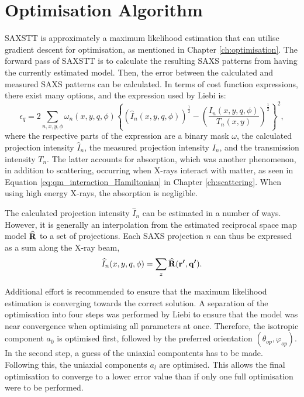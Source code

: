 \section{Optimisation Algorithm}

SAXSTT is approximately a maximum likelihood estimation that can utilise gradient descent for optimisation, as mentioned in Chapter \ref{ch:optimisation}.
The forward pass of SAXSTT is to calculate the resulting SAXS patterns from having the currently estimated model.
Then, the error between the calculated and measured SAXS patterns can be calculated.
In terms of cost function expressions, there exist many options, and the expression used by Liebi \cite{liebi2018small} is:
\begin{equation}
    \epsilon_{q} = 2 \sum_{n, x, y, \phi} \omega_{n}(x,y,q,\phi) \left\{ \left( \widehat{I}_{n}(x,y,q,\phi) \right)^{\frac{1}{2}}  -  \left( \frac{ I_{n}(x,y,q,\phi) }{T_{n}(x,y)} \right)^{\frac{1}{2}} \right\}^{2},
\end{equation}
\noindent
where the respective parts of the expression are a binary mask $\omega$, the calculated projection intensity $\widehat{I}_{n}$, the measured projection intensity $I_{n}$, and the transmission intensity $T_{n}$.
The latter accounts for absorption, which was another phenomenon, in addition to scattering, occurring when X-rays interact with matter,
as seen in Equation \eqref{eq:qm_interaction_Hamiltonian} in Chapter \ref{ch:scattering}. When using high energy X-rays, the absorption is negligible.

The calculated projection intensity $\widehat{I}_{n}$ can be estimated in a number of ways.
However, it is generally an interpolation from the estimated reciprocal space map model $\bm{\mathrm{\widehat{R}}}$ to a set of projections.
Each SAXS projection $n$ can thus be expressed as a sum along the X-ray beam,
\begin{equation}\label{eq:SAXS_intensity}
    \widehat{I}_{n}(x,y,q,\phi) = \sum_{z} \bm{\widehat{\mathrm{R}}}(\bm{\mathrm{r'}}, \bm{\mathrm{q'}}).
\end{equation}

Additional effort is recommended to ensure that the maximum likelihood estimation is converging towards the correct solution.
A separation of the optimisation into four steps was performed by Liebi \cite{liebi2018small} to ensure that the model was near convergence when optimising all parameters at once.
Therefore, the isotropic component $a_{0}$ is optimised first, followed by the preferred orientation $(\theta_{op}, \varphi_{op})$. In the second step, a guess of the uniaxial compontents has to be made.
Following this, the uniaxial components $a_{l}$ are optimised.
This allows the final optimisation to converge to a lower error value than if only one full optimisation were to be performed.


